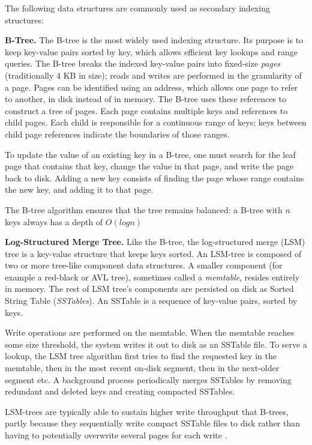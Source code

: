 The following data structures are commonly used as secondary indexing structures:

\medskip
\noindent
\textbf{B-Tree.}
The B-tree is the most widely used indexing structure.
Its purpose is to keep key-value pairs sorted by key, which allows efficient key lookups and range queries.
The B-tree breaks the indexed key-value pairs into fixed-size \textit{pages} (traditionally 4 KB in size);
reads and writes are performed in the granularity of a page.
Pages can be identified using an address, which allows one page to refer to another, in disk instead of in memory.
The B-tree uses these references to construct a tree of pages.
Each page contains multiple keys and references to child pages.
Each child is responsible for a continuous range of keys; keys between child page references indicate the boundaries
of those ranges.

To update the value of an existing key in a B-tree, one must search for the leaf page that contains that key,
change the value in that page, and write the page back to disk.
Adding a new key consists of finding the page whose range contains the new key, and adding it to that page.

The B-tree algorithm ensures that the tree remains balanced: a B-tree with $n$ keys always has a depth of $O(log n)$

\medskip
\noindent
\textbf{Log-Structured Merge Tree.}
Like the B-tree, the log-structured merge (LSM) tree is a key-value structure that keeps keys sorted.
An LSM-tree is composed of two or more tree-like component data structures.
A smaller component (for example a red-black or AVL tree), sometimes called a \textit{memtable},
resides entirely in memory.
The rest of LSM tree's components are persisted on disk as Sorted String Table (\textit{SSTables}).
An SSTable is a sequence of key-value pairs, sorted by keys.

Write operations are performed on the memtable.
When the memtable reaches some size threshold, the system writes it out to disk as an SSTable file.
To serve a lookup, the LSM tree algorithm first tries to find the requested key in the memtable,
then in the most recent on-disk segment, then in the next-older segment etc.
A background process periodically merges SSTables by removing redundant and deleted keys and creating compacted SSTables.

LSM-trees are typically able to sustain higher write throughput that B-trees, partly because they sequentially write
compact SSTable files to disk rather than having to potentially overwrite several pages for each write \cite{lsm:vsbtree}.

